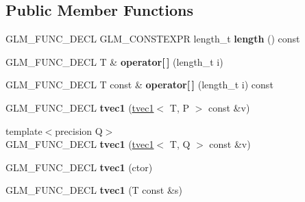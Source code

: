 \subsection*{Public Member Functions}
\begin{DoxyCompactItemize}
\item 
G\+L\+M\+\_\+\+F\+U\+N\+C\+\_\+\+D\+E\+CL G\+L\+M\+\_\+\+C\+O\+N\+S\+T\+E\+X\+PR length\+\_\+t {\bfseries length} () const \hypertarget{structglm_1_1detail_1_1tvec1_ac5c47cd98cf8ea5fb932d211e287d474}{}\label{structglm_1_1detail_1_1tvec1_ac5c47cd98cf8ea5fb932d211e287d474}

\item 
G\+L\+M\+\_\+\+F\+U\+N\+C\+\_\+\+D\+E\+CL T \& {\bfseries operator\mbox{[}$\,$\mbox{]}} (length\+\_\+t i)\hypertarget{structglm_1_1detail_1_1tvec1_adb575b50f9ef01bf4a6a4ecdfb82ac59}{}\label{structglm_1_1detail_1_1tvec1_adb575b50f9ef01bf4a6a4ecdfb82ac59}

\item 
G\+L\+M\+\_\+\+F\+U\+N\+C\+\_\+\+D\+E\+CL T const \& {\bfseries operator\mbox{[}$\,$\mbox{]}} (length\+\_\+t i) const \hypertarget{structglm_1_1detail_1_1tvec1_ac2a6b44e2d99aba17d96fcfec501da9a}{}\label{structglm_1_1detail_1_1tvec1_ac2a6b44e2d99aba17d96fcfec501da9a}

\item 
G\+L\+M\+\_\+\+F\+U\+N\+C\+\_\+\+D\+E\+CL {\bfseries tvec1} (\hyperlink{structglm_1_1detail_1_1tvec1}{tvec1}$<$ T, P $>$ const \&v)\hypertarget{structglm_1_1detail_1_1tvec1_a5c5c89fea0163e5ad580d6b66347c726}{}\label{structglm_1_1detail_1_1tvec1_a5c5c89fea0163e5ad580d6b66347c726}

\item 
{\footnotesize template$<$precision Q$>$ }\\G\+L\+M\+\_\+\+F\+U\+N\+C\+\_\+\+D\+E\+CL {\bfseries tvec1} (\hyperlink{structglm_1_1detail_1_1tvec1}{tvec1}$<$ T, Q $>$ const \&v)\hypertarget{structglm_1_1detail_1_1tvec1_ae1002300caf6841b5a2effd442691db1}{}\label{structglm_1_1detail_1_1tvec1_ae1002300caf6841b5a2effd442691db1}

\item 
G\+L\+M\+\_\+\+F\+U\+N\+C\+\_\+\+D\+E\+CL {\bfseries tvec1} (ctor)\hypertarget{structglm_1_1detail_1_1tvec1_a52af6de6e305cdb9769a58fe40c9d0ae}{}\label{structglm_1_1detail_1_1tvec1_a52af6de6e305cdb9769a58fe40c9d0ae}

\item 
G\+L\+M\+\_\+\+F\+U\+N\+C\+\_\+\+D\+E\+CL {\bfseries tvec1} (T const \&s)\hypertarget{structglm_1_1detail_1_1tvec1_adf94a9b437d8033044ea754fbbb18614}{}\label{structglm_1_1detail_1_1tvec1_adf94a9b437d8033044ea754fbbb18614}


\end{DoxyCompactItemize}
